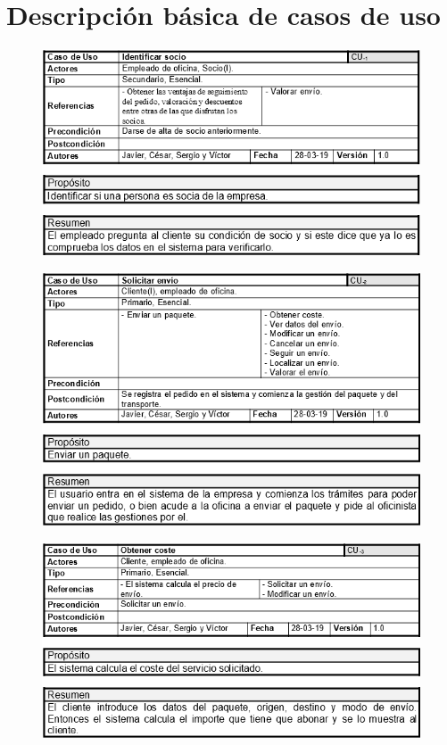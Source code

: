 \section{Descripción básica de casos de uso}
\begin{figure}[H]
	\centering
	\includegraphics[width=16cm]{1}
\end{figure}
\begin{figure}[H]
	\centering
	\includegraphics[width=16cm]{2}
\end{figure}
\begin{figure}[H]
	\centering
	\includegraphics[width=16cm]{3}
\end{figure}
